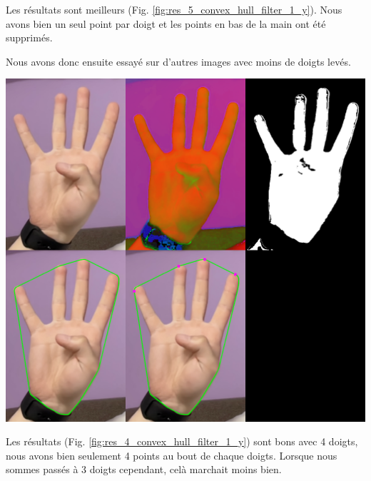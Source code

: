 \documentclass[11pt]{article}
\begin{document}
Les résultats sont meilleurs (Fig. \ref{fig:res_5_convex_hull_filter_1_y}). Nous avons bien un seul point par doigt et les points en bas de la main ont été supprimés. \bigbreak

Nous avons donc ensuite essayé sur d'autres images avec moins de doigts levés. \bigbreak

\begin{center}
    \includegraphics[width=\textwidth]{images/res_4_convex_hull_filter_1_y.png}
    \label{fig:res_4_convex_hull_filter_1_y}
\end{center}

Les résultats (Fig. \ref{fig:res_4_convex_hull_filter_1_y}) sont bons avec 4 doigts, nous avons bien seulement 4 points au bout de chaque doigts.
Lorsque nous sommes passés à 3 doigts cependant, celà marchait moins bien. \bigbreak
\end{document}
